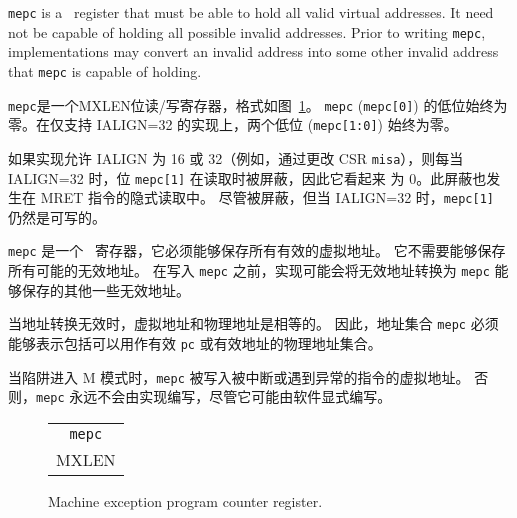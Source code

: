 {\tt mepc} is a \warl\ register that must be able to hold all valid
virtual addresses.  It need not be capable of holding all possible invalid
addresses.
Prior to writing {\tt mepc}, implementations may convert an invalid address
into some other invalid address that {\tt mepc} is capable of holding.
\fi

{\tt mepc}是一个MXLEN位读/写寄存器，格式如图~\ref{mepcreg}。 {\tt mepc} ({\tt mepc[0]}) 的低位始终为零。在仅支持 IALIGN=32 的实现上，两个低位 ({\tt mepc[1:0]}) 始终为零。

如果实现允许 IALIGN 为 16 或 32（例如，通过更改 CSR {\tt misa}），则每当 IALIGN=32 时，位 {\tt mepc[1]} 在读取时被屏蔽，因此它看起来 为 0。此屏蔽也发生在 MRET 指令的隐式读取中。 尽管被屏蔽，但当 IALIGN=32 时，{\tt mepc[1]} 仍然是可写的。

{\tt mepc} 是一个 \warl\ 寄存器，它必须能够保存所有有效的虚拟地址。 它不需要能够保存所有可能的无效地址。 在写入 {\tt mepc} 之前，实现可能会将无效地址转换为 {\tt mepc} 能够保存的其他一些无效地址。

\iffalse
\begin{commentary}
When address translation is not in effect, virtual addresses and physical
addresses are equal.
Hence, the set of addresses {\tt mepc} must be able to represent includes the
set of physical addresses that can be used as a valid {\tt pc} or effective
address.
\end{commentary}
\fi
\begin{commentary}
当地址转换无效时，虚拟地址和物理地址是相等的。 因此，地址集合 {\tt mepc} 必须能够表示包括可以用作有效 {\tt pc} 或有效地址的物理地址集合。
\end{commentary}

\iffalse
When a trap is taken into M-mode, {\tt mepc} is written with the
virtual address of the instruction that was interrupted or that
encountered the exception.  Otherwise, {\tt mepc} is never written by
the implementation, though it may be explicitly written by software.
\fi

当陷阱进入 M 模式时，{\tt mepc} 被写入被中断或遇到异常的指令的虚拟地址。 否则，{\tt mepc} 永远不会由实现编写，尽管它可能由软件显式编写。

\begin{figure}[h!]
{\footnotesize
\begin{center}
\begin{tabular}{@{}J}
 \\
\hline
{} \\
\hline
MXLEN \\
\end{tabular}
\end{center}
}
\vspace{-0.1in}
\caption{Machine exception program counter register.}
\label{mepcreg}
\end{figure}

